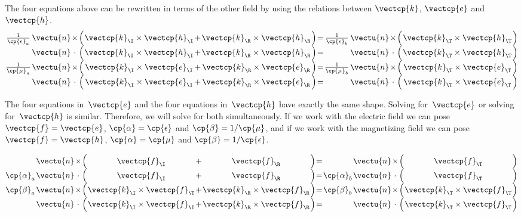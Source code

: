 \begin{refsection}
The four equations above can be rewritten in terms of the other field by using the relations between $\vectcp{k}$, $\vectcp{e}$ and $\vectcp{h}$.
\begin{equation}
    \arraycolsep=0.5pt%
    \begin{array}{ccccccccccccccc}
        \frac{1}{\cp{\epsilon}_a} & \vectu{n} & \times & \Big( & \vectcp{k}_\I \times \vectcp{h}_\I & + & \vectcp{k}_\R \times \vectcp{h}_\R & \Big) & = & \frac{1}{\cp{\epsilon}_b} & \vectu{n} & \times & \Big( & \vectcp{k}_\T \times \vectcp{h}_\T & \Big)
        \\
        & \vectu{n} & \cdot & \Big( & \vectcp{k}_\I \times \vectcp{h}_\I & + & \vectcp{k}_\R \times \vectcp{h}_\R & \Big) & = & & \vectu{n} & \cdot & \Big( & \vectcp{k}_\T \times \vectcp{h}_\T & \Big)
        \\
        \frac{1}{\cp{\mu}_a} & \vectu{n} & \times & \Big( & \vectcp{k}_\I \times \vectcp{e}_\I & + & \vectcp{k}_\R \times \vectcp{e}_\R & \Big) & = & \frac{1}{\cp{\mu}_b} & \vectu{n} & \times & \Big( & \vectcp{k}_\T \times \vectcp{e}_\T & \Big)
        \\
        & \vectu{n} & \cdot & \Big( & \vectcp{k}_\I \times \vectcp{e}_\I & + & \vectcp{k}_\R \times \vectcp{e}_\R & \Big) & = & & \vectu{n} & \cdot & \Big( & \vectcp{k}_\T \times \vectcp{e}_\T & \Big)
    \end{array}
\end{equation}

The four equations in~$\vectcp{e}$ and the four equations in~$\vectcp{h}$ have exactly the same shape.
Solving for~$\vectcp{e}$ or solving for~$\vectcp{h}$ is similar.
Therefore, we will solve for both simultaneously.
If we work with the electric field we can pose
$\vectcp{f}=\vectcp{e}$, $\cp{\alpha}=\cp{\epsilon}$ and $\cp{\beta}=1/\cp{\mu}$,
and if we work with the magnetizing field we can pose
$\vectcp{f}=\vectcp{h}$, $\cp{\alpha}=\cp{\mu}$ and $\cp{\beta}=1/\cp{\epsilon}$.

\begin{equation}
    \arraycolsep=0.5pt%
    \begin{array}{ccccccccccccccc}
        & \vectu{n} & \times & \Big( & \vectcp{f}_\I & + & \vectcp{f}_\R & \Big) & = & & \vectu{n} & \times & \Big( & \vectcp{f}_\T & \Big)
        \\
        \cp{\alpha}_a & \vectu{n} & \cdot & \Big( & \vectcp{f}_\I & + & \vectcp{f}_\R & \Big) & = & \cp{\alpha}_b & \vectu{n} & \cdot & \Big( & \vectcp{f}_\T & \Big)
        \\
        \cp{\beta}_a & \vectu{n} & \times & \Big( & \vectcp{k}_\I \times \vectcp{f}_\T & + & \vectcp{k}_\R \times \vectcp{f}_\R & \Big) & = & \cp{\beta}_b & \vectu{n} & \times & \Big( & \vectcp{k}_\T \times \vectcp{f}_\T & \Big)
        \\
        & \vectu{n} & \cdot & \Big( & \vectcp{k}_\I \times \vectcp{f}_\I & + & \vectcp{k}_\R \times \vectcp{f}_\R & \Big) & = & & \vectu{n} & \cdot & \Big( & \vectcp{k}_\T \times \vectcp{f}_\T & \Big)
    \end{array}
\end{equation}


\end{refsection}
